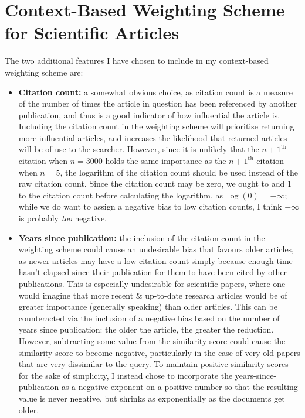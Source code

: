\documentclass[a4paper]{article}
\begin{document}
\section{Context-Based Weighting Scheme for Scientific Articles}
The two additional features I  have chosen to include in my context-based weighting scheme are:
\begin{itemize}
    \item   \textbf{Citation count:} a somewhat obvious choice, as citation count is a measure of the number of times the article in question has been referenced by another publication, and thus is a good indicator of how influential the article is.
            Including the citation count in the weighting scheme will prioritise returning more influential articles, and increases the likelihood that returned articles will be of use to the searcher.
            However, since it is unlikely that the $n+1^\text{th}$ citation when $n = 3000$ holds the same importance as the $n+1^\text{th}$ citation when $n = 5$, the logarithm of the citation count should be used instead of the raw citation count.
            Since the citation count may be zero, we ought to add 1 to the citation count before calculating the logarithm, as $\log(0) = - \infty$; while we do want to assign a negative bias to low citation counts, I think $-\infty$ is probably \textit{too} negative.

    \item   \textbf{Years since publication:} the inclusion of the citation count in the weighting scheme could cause an undesirable bias that favours older articles, as newer articles may have a low citation count simply because enough time hasn't elapsed since their publication for them to have been cited by other publications.
            This is especially undesirable for scientific papers, where one would imagine that more recent \& up-to-date research articles would be of greater importance (generally speaking) than older articles.
            This can be counteracted via the inclusion of a negative bias based on the number of years since publication: the older the article, the greater the reduction.
            However, subtracting some value from the similarity score could cause the similarity score to become negative, particularly in the case of very old papers that are very dissimilar to the query.
            To maintain positive similarity scores for the sake of simplicity, I instead chose to incorporate the years-since-publication as a negative exponent on a positive number so that the resulting value is never negative, but shrinks as exponentially as the documents get older.
\end{itemize}
\end{document}
